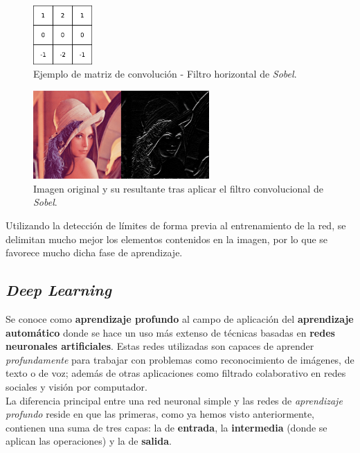\documentclass[]{article}
\begin{document}
			\begin{figure}[h]
				\centering
				\includegraphics[width=0.2\textwidth]{./img/horizontal-sobel}
				\caption{Ejemplo de matriz de convolución - Filtro horizontal de \textit{Sobel}.}
				\label{conv-filter}
			\end{figure}
		
			\begin{figure}[h]
				\centering
				\includegraphics[width=0.6\textwidth]{./img/lenna+horizontal}
				\caption{Imagen original y su resultante tras aplicar el filtro convolucional de \textit{Sobel}.}
				\label{conv-filter-result}
			\end{figure}
		
			Utilizando la detección de límites de forma previa al entrenamiento de la red, se delimitan mucho mejor los elementos contenidos en la imagen, por lo que se favorece mucho dicha fase de aprendizaje.
	
	\subsection{\textit{Deep Learning}}
	
		Se conoce como \textbf{aprendizaje profundo} al campo de aplicación del \textbf{aprendizaje automático} donde se hace un uso más extenso de técnicas basadas en \textbf{redes neuronales artificiales}. Estas redes utilizadas son capaces de aprender \textit{profundamente} para trabajar con problemas como reconocimiento de imágenes, de texto o de voz; además de otras aplicaciones como filtrado colaborativo en redes sociales y visión por computador.\\
		
		La diferencia principal entre una red neuronal simple y las redes de \textit{aprendizaje profundo} reside en que las primeras, como ya hemos visto anteriormente, contienen una suma de tres capas: la de \textbf{entrada}, la \textbf{intermedia} (donde se aplican las operaciones) y la de \textbf{salida}.\\
		
\end{document}
